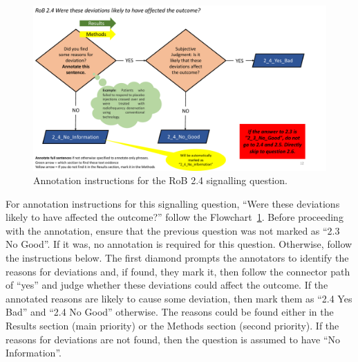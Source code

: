 \documentclass[sn-mathphys,Numbered]{sn-jnl}%
\begin{document}
%
%
%
\begin{figure}[hbt]
    \centering
    \includegraphics[width=\textwidth]{figures/2_4.pdf}
    \caption{Annotation instructions for the RoB 2.4 signalling question.}
    \label{fig:2_4}
\end{figure}
%
%
%
For annotation instructions for this signalling question, ``Were these deviations likely to have affected the outcome?'' follow the Flowchart~\ref{fig:2_4}.
Before proceeding with the annotation, ensure that the previous question was not marked as ``2.3 No Good''.
If it was, no annotation is required for this question.
Otherwise, follow the instructions below.
The first diamond prompts the annotators to identify the reasons for deviations and, if found, they mark it, then follow the connector path of ``yes'' and judge whether these deviations could affect the outcome.
If the annotated reasons are likely to cause some deviation, then mark them as ``2.4 Yes Bad'' and ``2.4 No Good'' otherwise.
The reasons could be found either in the Results section (main priority) or the Methods section (second priority).
If the reasons for deviations are not found, then the question is assumed to have ``No Information''.
%
%
%
\end{document}
